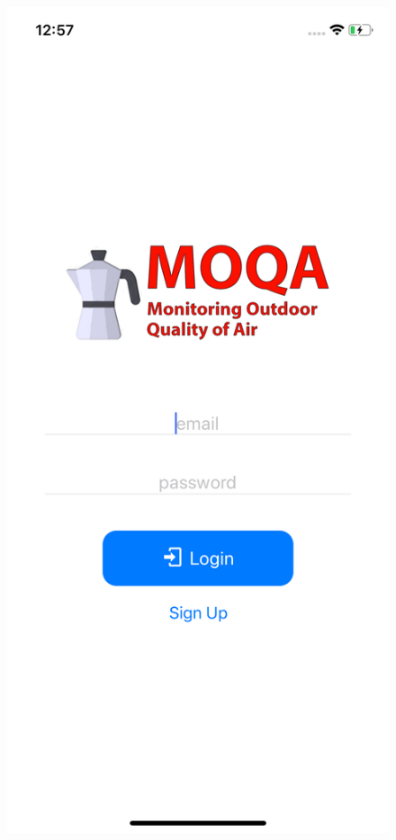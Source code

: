 \begin{figure}[H]
\centering
\includegraphics[height=.6\textheight]{./img/ui/login.png}

\end{figure}
